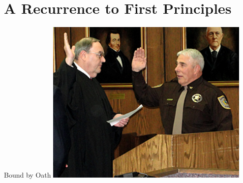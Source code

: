 \section{A Recurrence to First Principles}

\begin{frame}{Bound by Oath}
    \centering
    \includegraphics[width=0.75\textwidth]{img/sheriff-oath.png} \\
\end{frame}


